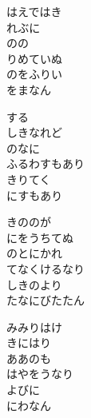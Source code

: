 \documentclass[10pt,b5j]{tarticle} %
\begin{document}
\vspace{1.5em} %
\newcommand{\linespace}{0.5em} %
\newcommand{\blocksize}{0.5\hsize} %
\begin{enumerate} %
    \begin{minipage}[c]{\blocksize}
    
        \vspace{\linespace}
        \item
        はえではき\\
        れぶに\\
        のの\\
        りめていぬ\\
        のをふりい\\
        をまなん
        
        \vspace{\linespace}
        \item
        する\\
        しきなれど\\
        のなに\\
        ふるわすもあり\\
        きりてく\\
        にすもあり
        
        \vspace{\linespace}
        \item
        きののが\\
        にをうちてぬ\\
        のとにかれ\\
        てなくけるなり\\
        しきのより\\
        たなにびたたん
        
        \vspace{\linespace}
        \item
        みみりはけ\\
        きにはり\\
        ああのも\\
        はやをうなり\\
        よびに\\
        にわなん
    

\end{minipage}
\end{enumerate}
\end{document}
